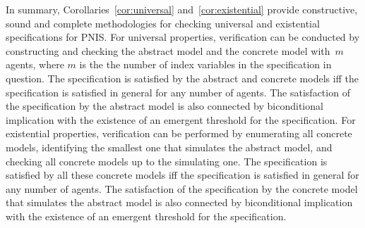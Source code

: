 In summary, Corollaries~\ref{cor:universal} and~\ref{cor:existential} provide
constructive, sound and complete methodologies for checking universal and 
existential specifications for PNIS.  For universal properties, verification can
be conducted by constructing and checking the abstract model and the concrete
model with~$m$ agents, where $m$ is the the number of index variables in the
specification in question. The specification is satisfied by the abstract and
concrete models iff the specification is satisfied in general for any number of
agents.  The satisfaction of the specification by the abstract model is also
connected by biconditional implication with the existence of an emergent
threshold for the specification. For existential properties, verification can be
performed by enumerating all concrete models, identifying the smallest one that simulates the abstract model,
 and checking all concrete models up to the simulating one. 
 The specification is satisfied by all these
concrete models iff the specification is satisfied in general for any number of
agents.   The satisfaction of the specification by the concrete model that
simulates the abstract model is also connected by biconditional implication with
the existence of an emergent threshold for the specification. 









